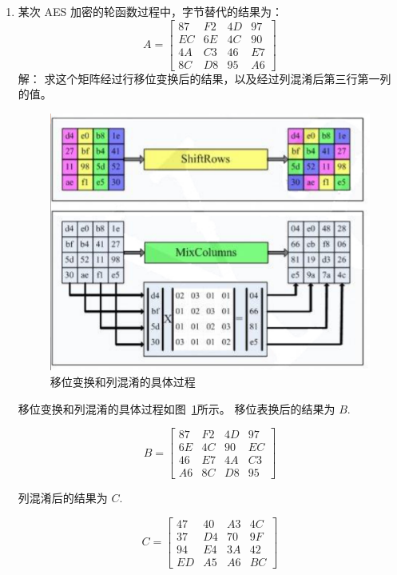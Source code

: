 \documentclass[degree=project,degree-type=project,cjk-font=noto]{thuthesis}
\begin{document}
\begin{enumerate}
\item 某次 AES 加密的轮函数过程中，字节替代的结果为：
\begin{equation}
  A = \begin{bmatrix}
  87 & F2 & 4D & 97 \\
  EC & 6E & 4C & 90 \\
  4A & C3 & 46 & E7 \\
  8C & D8 & 95 & A6
  \end{bmatrix}
\end{equation}
{\heiti 解：}
\newline
求这个矩阵经过行移位变换后的结果，以及经过列混淆后第三行第一列的值。

\begin{figure}[!htp]
\centering%
\includegraphics[width=.7\linewidth]{aes.png}
  \caption{移位变换和列混淆的具体过程}
  \label{fig:aes}
\end{figure}

移位变换和列混淆的具体过程如图~\ref{fig:aes}所示。
移位表换后的结果为 $B$.

\begin{equation}
  B = \begin{bmatrix}
  87 & F2 & 4D & 97 \\
  6E & 4C & 90 & EC \\
  46 & E7 & 4A & C3 \\
  A6 & 8C & D8 & 95
  \end{bmatrix}
\end{equation}

列混淆后的结果为 $C$.

\begin{equation}
  C = \begin{bmatrix}
  47 & 40 & A3 & 4C \\
  37 & D4 & 70 & 9F \\
  94 & E4 & 3A & 42 \\
  ED & A5 & A6 & BC
  \end{bmatrix}
\end{equation}


\end{enumerate}
\end{document}
